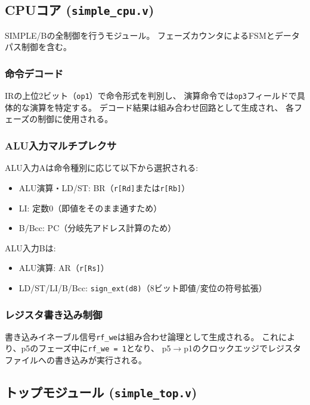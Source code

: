 \documentclass[a4paper,11pt]{ltjsarticle}
\begin{document}
\subsection{CPUコア (\texttt{simple\_cpu.v})}

SIMPLE/Bの全制御を行うモジュール。
フェーズカウンタによるFSMとデータパス制御を含む。



\subsubsection{命令デコード}

IRの上位2ビット（\texttt{op1}）で命令形式を判別し、
演算命令では\texttt{op3}フィールドで具体的な演算を特定する。
デコード結果は組み合わせ回路として生成され、
各フェーズの制御に使用される。

\subsubsection{ALU入力マルチプレクサ}

ALU入力Aは命令種別に応じて以下から選択される:
\begin{itemize}
\item ALU演算・LD/ST: BR（\texttt{r[Rd]}または\texttt{r[Rb]}）
\item LI: 定数0（即値をそのまま通すため）
\item B/Bcc: PC（分岐先アドレス計算のため）
\end{itemize}

ALU入力Bは:
\begin{itemize}
\item ALU演算: AR（\texttt{r[Rs]}）
\item LD/ST/LI/B/Bcc: \texttt{sign\_ext(d8)}（8ビット即値/変位の符号拡張）
\end{itemize}

\subsubsection{レジスタ書き込み制御}

書き込みイネーブル信号\texttt{rf\_we}は組み合わせ論理として生成される。
これにより、p5のフェーズ中に\texttt{rf\_we = 1}となり、
p5$\rightarrow$p1のクロックエッジでレジスタファイルへの書き込みが実行される。

\subsection{トップモジュール (\texttt{simple\_top.v})}
\end{document}
